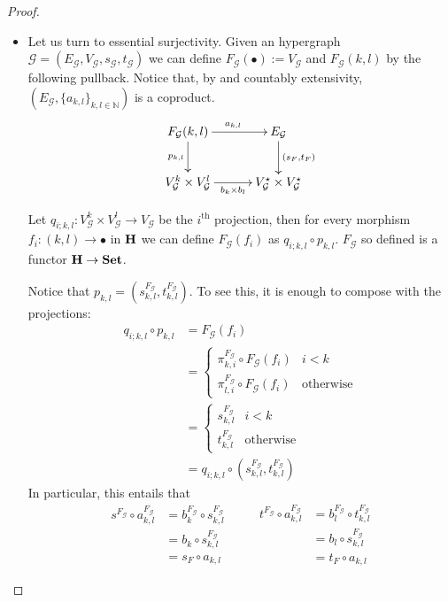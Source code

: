 \documentclass[runningheads,envcountsect]{llncs}
\newcommand{\catname}[1]{\textbf{\textup{#1}}}
\begin{document}
\begin{proof}
\begin{itemize}
		\item  Let us turn to essential surjectivity. Given an hypergraph $\mathcal{G}=(E_\mathcal{G}, V_\mathcal{G}, s_\mathcal{G}, t_\mathcal{G})$ we can define $F_{\mathcal{G}}(\bullet):=V_{\mathcal{G}}$ and $F_{\mathcal{G}}(k,l)$ by the following pullback. Notice that, by  and countably extensivity, $(E_{\mathcal{{G}}}, \{a_{k,l}\}_{k,l\in \mathbb{N}})$ is a coproduct.
		\[\xymatrix@C=30pt{F_\mathcal{G}(k,l) \ar[d]_{p_{k,l}}  \ar[r]^{a_{k,l}}& E_{\mathcal{G}} \ar[d]^{(s_F, t_F)} \\ V_{\mathcal{G}}^k\times V_{\mathcal{G}}^l \ar[r]_{b_k\times b_l} & V_{\mathcal{G}}^\star\times V_{\mathcal{G}}^\star}\]
		
		Let $q_{i;k,l}\colon V_\mathcal{G}^k\times V_{\mathcal{G}}^l\to V_\mathcal{G} $ be the $i^{\text{th}}$ projection, then for every morphism $f_i\colon (k,l)\to \bullet$ in $\catname{H}$ we can define $F_{\mathcal{G}}(f_i)$ as $q_{i; k,l}\circ p_{k,l}$. $F_{\mathcal{G}}$ so defined is a functor $\catname{H}\to \catname{Set}$. 
		
		Notice that $p_{k,l}=(s^{F_{\mathcal{G}}}_{k,l}, t^{F_{\mathcal{G}}}_{k,l})$. To see this, it is enough to compose with the projections:
		\begin{align*}
			q_{i;k,l}\circ p_{k,l}&=F_{\mathcal{G}}(f_i)\\&=\begin{cases}
				\pi^{F_{\mathcal{G}}}_{k, i} \circ F_{\mathcal{G}}(f_i) & i<k\\
				\pi^{F_{\mathcal{G}}}_{l, i} \circ F_{\mathcal{G}}(f_i) &\text{otherwise}
			\end{cases}\\&=\begin{cases}
		s^{F_{\mathcal{G}}}_{k,l} & i<k\\
		t^{F_{\mathcal{G}}}_{k,l} &\text{otherwise}
			\end{cases}\\&=q_{i;k,l}\circ (s^{F_{\mathcal{G}}}_{k,l}, t^{F_{\mathcal{G}}}_{k,l})
		\end{align*}
		In particular, this entails that 
		\[\begin{split}
	s^{F_{\mathcal{G}}}\circ a^{F_{\mathcal{G}}}_{k,l}&=b^{F_{\mathcal{G}}}_k \circ s^{F_{\mathcal{G}}}_{k,l}\\&= b_k \circ s^{F_{\mathcal{G}}}_{k,l}\\&=s_F\circ a_{k,l}
		\end{split} \qquad \begin{split}
	t^{F_{\mathcal{G}}}\circ a^{F_{\mathcal{G}}}_{k,l}&=b^{F_{\mathcal{G}}}_l \circ t^{F_{\mathcal{G}}}_{k,l}\\&= b_l \circ s^{F_{\mathcal{G}}}_{k,l}\\&=t_F\circ a_{k,l}
		\end{split}\]
	

\end{itemize}
\end{proof}
\end{document}
